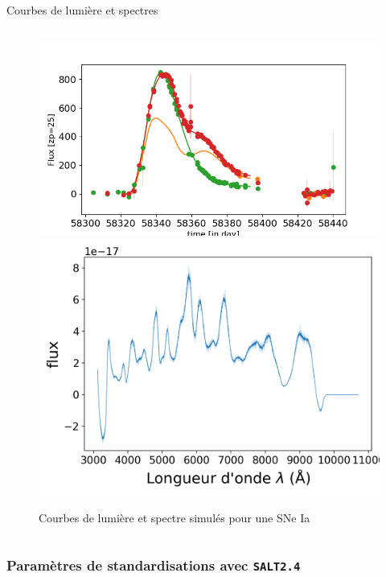 \documentclass{beamer}
\def\saltd{\texttt{SALT2.4}\xspace}
\begin{document}
\begin{frame}{Courbes de lumière et spectres}
\begin{columns}
\begin{column}{.8\textwidth}
\begin{figure}
	\centering
	\includegraphics[width=.49\textwidth]{figures/26_lc.png}
	\hfill
	\includegraphics[width=.49\textwidth]{figures/26_spec.png}
	\caption{Courbes de lumière et spectre simulés pour une SNe Ia}
\end{figure}
	\end{column}
\end{columns}
\end{frame}


\subsubsection{Paramètres de standardisations avec \saltd}
\end{document}
